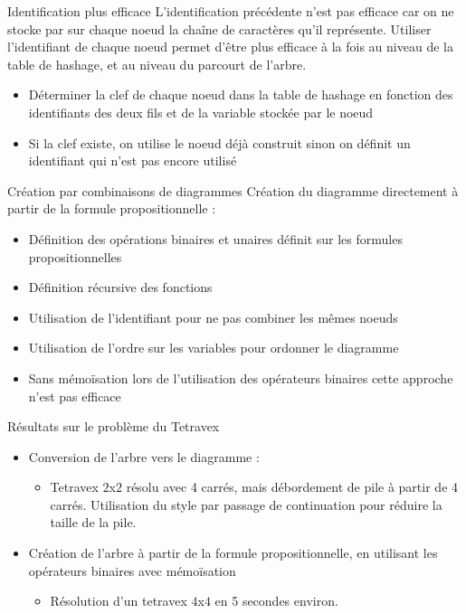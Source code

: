 \documentclass{beamer}
\begin{document}
\begin{frame}{Identification plus efficace}
L'identification précédente n'est pas efficace car on ne stocke par sur chaque noeud la chaîne de caractères qu'il représente. Utiliser l'identifiant de chaque noeud permet d'être plus efficace à la fois au niveau de la table de hashage, et au niveau du parcourt de l'arbre.
\begin{itemize}
\item Déterminer la clef de chaque noeud dans la table de hashage en fonction des identifiants des deux fils et de la variable stockée par le noeud
\item Si la clef existe, on utilise le noeud déjà construit sinon on définit un identifiant qui n'est pas encore utilisé
\end{itemize}
\end{frame}

\begin{frame}{Création par combinaisons de diagrammes}
Création du diagramme directement à partir de la formule propositionnelle :
\begin{itemize}
\item Définition des opérations binaires et unaires définit sur les formules propositionnelles
\item Définition récursive des fonctions
\item Utilisation de l'identifiant pour ne pas combiner les mêmes noeuds
\item Utilisation de l'ordre sur les variables pour ordonner le diagramme
\item Sans mémoïsation lors de l'utilisation des opérateurs binaires cette approche n'est pas efficace
\end{itemize}
\end{frame}

\begin{frame}{Résultats sur le problème du Tetravex}
\begin{itemize}
\item Conversion de l'arbre vers le diagramme : 
\begin{itemize}
\item Tetravex $2$x$2$ résolu avec 4 carrés, mais débordement de pile à partir de 4 carrés. Utilisation du style par passage de continuation pour réduire la taille de la pile.
\end{itemize}
\item Création de l'arbre à partir de la formule propositionnelle, en utilisant les opérateurs binaires avec mémoïsation
\begin{itemize}
\item Résolution d'un tetravex $4$x$4$ en 5 secondes environ.
\end{itemize}
\end{itemize}
\end{frame}
	
\end{document}
